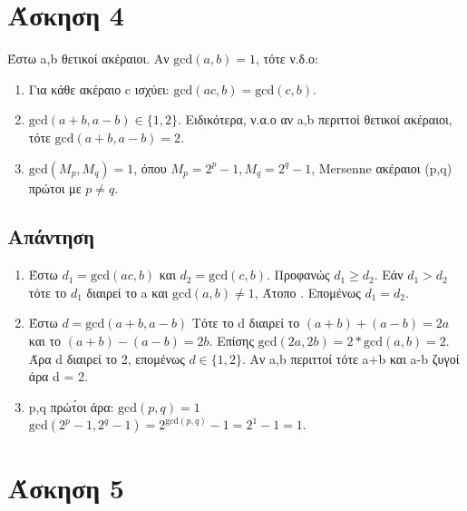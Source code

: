 \documentclass[12pt]{article}
\begin{document}
\section*{Άσκηση 4}

Έστω a,b θετικοί ακέραιοι. Αν \( \text{gcd}(a,b) = 1 \), τότε ν.δ.ο:
\begin{enumerate}
    \item Για κάθε ακέραιο c ισχύει: \( \text{gcd}(ac,b) = \text{gcd}(c,b) \). 
    \item \( \text{gcd}(a+b,a-b) \in \{1,2\}\). Ειδικότερα, ν.α.ο αν a,b περιττοί θετικοί ακέραιοι, τότε \( \text{gcd}(a+b,a-b) = 2\).
    \item \( \text{gcd}(M_p,M_q) = 1\), όπου \(M_p = 2^p - 1, M_q = 2^q - 1\), Mersenne ακέραιοι (p,q) πρώτοι με \( p \ne q \).
\end{enumerate}

\subsection*{Απάντηση}
\begin{enumerate}
    \item  Έστω \( d_1 = \text{gcd}(ac,b) \) και \(d_2 = \text{gcd}(c,b) \). Προφανώς \( d_1 \ge d_2 \).
    \newline
    \newline
    Εάν \( d_1 > d_2 \) τότε το \( d_1 \) διαιρεί το a και \( \text{gcd}(a,b) \neq 1 \), Άτοπο . Επομένως \( d_1 = d_2 \).     
    \item Έστω \( d = \text{gcd}(a+b,a-b) \)
    \newline
    \newline
    Τότε το d διαιρεί το \( (a+b) + (a-b) = 2a \) και το \( (a+b) - (a-b) = 2b \). Επίσης \( \text{gcd}(2a,2b) = 2*\text{gcd}(a,b) = 2 \). Άρα d διαιρεί το 2, επομένως \( d \in \{1,2\} \). 
    \newline
    \newline
    Αν a,b περιττοί τότε a+b και a-b ζυγοί άρα d = 2.
    \item p,q πρώτ́οι άρα: \( \text{gcd}(p,q) = 1 \)
    \newline
    \newline
    \( \text{gcd}(2^p-1,2^q-1) = 2^{\text{gcd}(p,q)}-1 = 2^1 -1 = 1 \).

\end{enumerate}
\hfill \blacksquare

\section*{Άσκηση 5}
\end{document}

